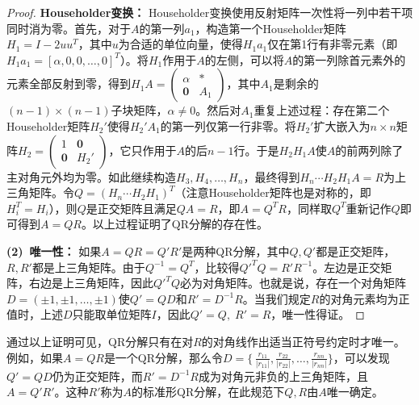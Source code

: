 \begin{proof}
	\textbf{Householder变换：} Householder变换使用反射矩阵一次性将一列中若干项同时消为零。首先，对于$A$的第一列$a_1$，构造第一个Householder矩阵$H_1=I - 2uu^T$，其中$u$为合适的单位向量，使得$H_1 a_1$仅在第1行有非零元素（即$H_1 a_1 = [\alpha,0,0,\dots,0]^T$）。将$H_1$作用于$A$的左侧，可以将$A$的第一列除首元素外的元素全部反射到零，得到$H_1A=\begin{pmatrix}\alpha & * \\ \mathbf{0} & A_1\end{pmatrix}$，其中$A_1$是剩余的$(n-1)\times(n-1)$子块矩阵，$\alpha\neq0$。然后对$A_1$重复上述过程：存在第二个Householder矩阵$H_2'$使得$H_2' A_1$的第一列仅第一行非零。将$H_2'$扩大嵌入为$n\times n$矩阵$H_2=\begin{pmatrix}1 & \mathbf{0}\\ \mathbf{0} & H_2'\end{pmatrix}$，它只作用于$A$的后$n-1$行。于是$H_2H_1 A$使$A$的前两列除了主对角元外均为零。如此继续构造$H_3,H_4,\dots,H_n$，最终得到$H_n \cdots H_2 H_1 A = R$为上三角矩阵。令$Q = (H_n \cdots H_2 H_1)^T$（注意Householder矩阵也是对称的，即$H_i^T = H_i$），则$Q$是正交矩阵且满足$Q A = R$，即$A=Q^T R$，同样取$Q^T$重新记作$Q$即可得到$A=QR$。以上过程证明了QR分解的存在性。
	\par
	\textbf{(2)~唯一性：} 如果$A=Q R = Q' R'$是两种QR分解，其中$Q,Q'$都是正交矩阵，$R,R'$都是上三角矩阵。由于$Q^{-1} = Q^T$，比较得$Q'^T Q = R' R^{-1}$。左边是正交矩阵，右边是上三角矩阵，因此$Q'^T Q$必为对角矩阵。也就是说，存在一个对角矩阵$D=(\pm1,\pm1,\dots,\pm1)$使$Q' = QD$和$R' = D^{-1} R$。当我们规定$R$的对角元素均为正值时，上述$D$只能取单位矩阵$I$，因此$Q'=Q,\;R'=R$，唯一性得证。
\end{proof}

\begin{note}
	通过以上证明可见，QR分解只有在对$R$的对角线作出适当正符号约定时才唯一。例如，如果$A=Q R$是一个QR分解，那么令$D=\{\,\frac{r_{11}}{|r_{11}|},\frac{r_{22}}{|r_{22}|},\dots,\frac{r_{nn}}{|r_{nn}|}\}$，可以发现$Q'=QD$仍为正交矩阵，而$R'=D^{-1}R$成为对角元非负的上三角矩阵，且$A=Q'R'$。这种$R'$称为$A$的标准形QR分解，在此规范下$Q,R$由$A$唯一确定。
\end{note}


